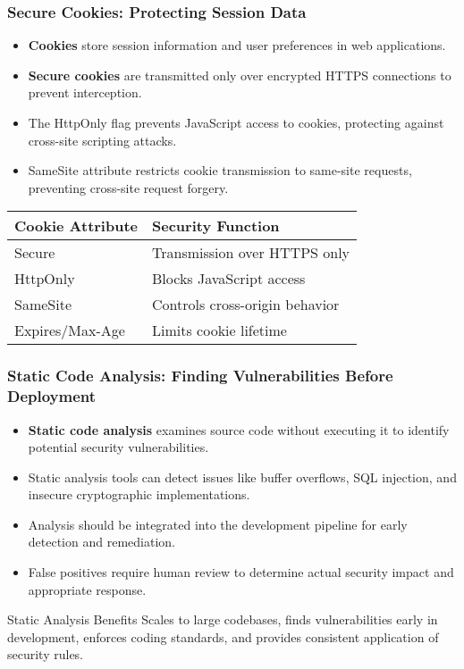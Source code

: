 \documentclass{beamer}
\begin{document}
\begin{frame}
    \frametitle{Secure Cookies: Protecting Session Data}
    
    \begin{itemize}
        \item \textbf{Cookies} store session information and user preferences in web applications.
        \item \textbf{Secure cookies} are transmitted only over encrypted HTTPS connections to prevent interception.
        \item The HttpOnly flag prevents JavaScript access to cookies, protecting against cross-site scripting attacks.
        \item SameSite attribute restricts cookie transmission to same-site requests, preventing cross-site request forgery.
    \end{itemize}
    
    \begin{table}
        \begin{tabular}{|l|p{5cm}|}
            \hline
            \textbf{Cookie Attribute} & \textbf{Security Function} \\
            \hline
            Secure & Transmission over HTTPS only \\
            HttpOnly & Blocks JavaScript access \\
            SameSite & Controls cross-origin behavior \\
            Expires/Max-Age & Limits cookie lifetime \\
            \hline
        \end{tabular}
    \end{table}
\end{frame}

\begin{frame}
    \frametitle{Static Code Analysis: Finding Vulnerabilities Before Deployment}
    
    \begin{itemize}
        \item \textbf{Static code analysis} examines source code without executing it to identify potential security vulnerabilities.
        \item Static analysis tools can detect issues like buffer overflows, SQL injection, and insecure cryptographic implementations.
        \item Analysis should be integrated into the development pipeline for early detection and remediation.
        \item False positives require human review to determine actual security impact and appropriate response.
    \end{itemize}
    
    \begin{block}{Static Analysis Benefits}
        Scales to large codebases, finds vulnerabilities early in development, enforces coding standards, and provides consistent application of security rules.
    \end{block}
\end{frame}
\end{document}
